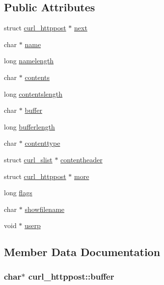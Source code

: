\subsection*{Public Attributes}
\begin{DoxyCompactItemize}
\item 
struct \hyperlink{structcurl__httppost}{curl\+\_\+httppost} $\ast$ \hyperlink{structcurl__httppost_a09be6ec2bb379d4580f5022be3fa65d7}{next}
\item 
char $\ast$ \hyperlink{structcurl__httppost_a220d8914fab9c2b11df43e4489c9ebb3}{name}
\item 
long \hyperlink{structcurl__httppost_aaabe46ae54c1b46510d704f71bcfc041}{namelength}
\item 
char $\ast$ \hyperlink{structcurl__httppost_abe65acc6cb851361062d0db3f7a6c5b5}{contents}
\item 
long \hyperlink{structcurl__httppost_ac24054760afb7cde780d2bfafae95cce}{contentslength}
\item 
char $\ast$ \hyperlink{structcurl__httppost_a10d800f5b6b4486907f3ff6adfa7d99b}{buffer}
\item 
long \hyperlink{structcurl__httppost_a2cc7607526bc628dad57f59d5ea1fa72}{bufferlength}
\item 
char $\ast$ \hyperlink{structcurl__httppost_aec999c1b21ea36a41c1c5091e4ac079b}{contenttype}
\item 
struct \hyperlink{structcurl__slist}{curl\+\_\+slist} $\ast$ \hyperlink{structcurl__httppost_a8f632bdc568ef8116fb07ad64ec1fbc4}{contentheader}
\item 
struct \hyperlink{structcurl__httppost}{curl\+\_\+httppost} $\ast$ \hyperlink{structcurl__httppost_ae172f44466b43441fc1429e1ff198753}{more}
\item 
long \hyperlink{structcurl__httppost_a937965b8a5e172edabdc08768ff0c76a}{flags}
\item 
char $\ast$ \hyperlink{structcurl__httppost_a84945dbb6cf774682227cfaab2ba7e01}{showfilename}
\item 
void $\ast$ \hyperlink{structcurl__httppost_ad2e5d00f8c4c6c536860599701c69694}{userp}
\end{DoxyCompactItemize}


\subsection{Member Data Documentation}
\subsubsection[{\texorpdfstring{buffer}{buffer}}]{\setlength{\rightskip}{0pt plus 5cm}char$\ast$ curl\+\_\+httppost\+::buffer}\hypertarget{structcurl__httppost_a10d800f5b6b4486907f3ff6adfa7d99b}{}\label{structcurl__httppost_a10d800f5b6b4486907f3ff6adfa7d99b}

